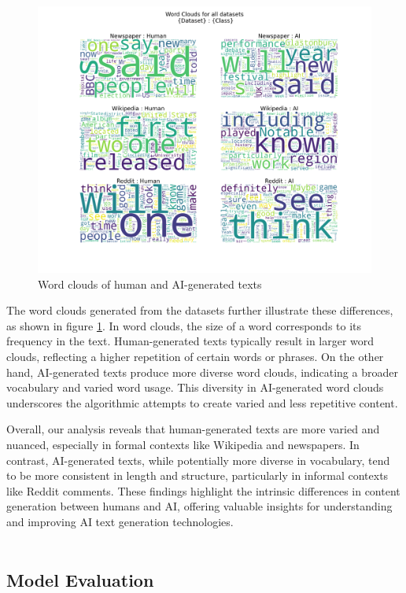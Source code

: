 \documentclass[11pt]{article}
\begin{document}
\begin{figure}[H]
  \centering
  \includegraphics[width=\linewidth]{All_word_clouds.png}
  \caption{Word clouds of human and AI-generated texts}
  \label{fig:word_clouds}
\end{figure}
The word clouds generated from the datasets further illustrate these differences, as shown in figure \ref{fig:word_clouds}. In word clouds, the size of a word corresponds to its frequency in the text. Human-generated texts typically result in larger word clouds, reflecting a higher repetition of certain words or phrases. On the other hand, AI-generated texts produce more diverse word clouds, indicating a broader vocabulary and varied word usage. This diversity in AI-generated word clouds underscores the algorithmic attempts to create varied and less repetitive content.

Overall, our analysis reveals that human-generated texts are more varied and nuanced, especially in formal contexts like Wikipedia and newspapers. In contrast, AI-generated texts, while potentially more diverse in vocabulary, tend to be more consistent in length and structure, particularly in informal contexts like Reddit comments. These findings highlight the intrinsic differences in content generation between humans and AI, offering valuable insights for understanding and improving AI text generation technologies.
\\
\\
\subsection{Model Evaluation}
\end{document}
